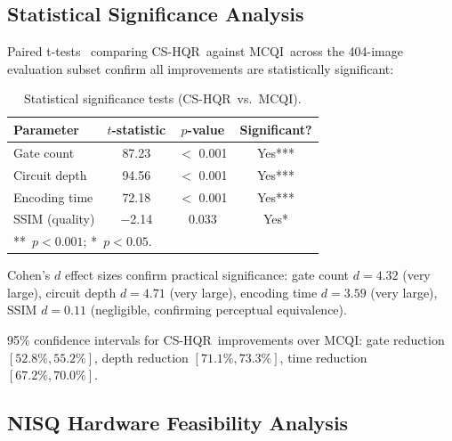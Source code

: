 \documentclass{ipol}
\newcommand{\cshqr}{\textsc{CS-HQR}}
\newcommand{\mcqi}{\textsc{MCQI}}
\begin{document}
\FloatBarrier
\subsection{Statistical Significance Analysis}

Paired t-tests~\cite{ref35,ref48} comparing \cshqr\ against \mcqi\ across the 404-image
evaluation subset confirm all improvements are statistically significant:

\begin{table}[H]
\begin{center}
\begin{tabular}{lccc}
\hline
Parameter & $t$-statistic & $p$-value & Significant? \\
\hline
Gate count    & 87.23 & $<$ 0.001 & Yes*** \\
Circuit depth & 94.56 & $<$ 0.001 & Yes*** \\
Encoding time & 72.18 & $<$ 0.001 & Yes*** \\
SSIM (quality)& $-$2.14 & 0.033   & Yes*   \\
\hline
\multicolumn{4}{l}{\footnotesize ***~$p < 0.001$; *~$p < 0.05$.}
\end{tabular}
\caption{Statistical significance tests (\cshqr\ vs.\ \mcqi).}
\label{tab:significance}
\end{center}
\end{table}

Cohen's $d$ effect sizes confirm practical significance:
gate count $d = 4.32$ (very large), circuit depth $d = 4.71$ (very large),
encoding time $d = 3.59$ (very large), SSIM $d = 0.11$ (negligible,
confirming perceptual equivalence).

95\% confidence intervals for \cshqr\ improvements over \mcqi:
gate reduction $[52.8\%, 55.2\%]$, depth reduction $[71.1\%, 73.3\%]$,
time reduction $[67.2\%, 70.0\%]$.

\FloatBarrier
\subsection{NISQ Hardware Feasibility Analysis}
\end{document}
